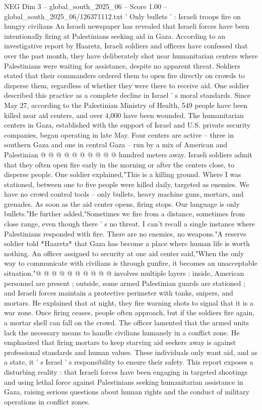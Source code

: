 \begin{textsample}{NEG Dim 3 – global\_south\_2025\_06 – Score 1.00 – global\_south\_2025\_06/126371112.txt}  \label{ex:f3_neg_259}
' Only bullets ' : Israeli troops fire on hungry civilians An Israeli newspaper has revealed that Israeli forces have been intentionally firing at Palestinians seeking aid in Gaza.
According to an investigative report by Haaretz, Israeli soldiers and officers have confessed that over the past month, they have deliberately shot near humanitarian centers where Palestinians were waiting for assistance, despite no apparent threat.
Soldiers stated that their commanders ordered them to open fire directly on crowds to disperse them, regardless of whether they were there to receive aid.
One soldier described this practice as a complete decline in Israel ' s moral standards.
Since May 27, according to the Palestinian Ministry of Health, 549 people have been killed near aid centers, and over 4,000 have been wounded.
The humanitarian centers in Gaza, established with the support of Israel and U.S. private security companies, began operating in late May.
Four centers are active -- three in southern Gaza and one in central Gaza -- run by a mix of American and Palestinian @ @ @ @ @ @ @ @ @ @ hundred meters away.
Israeli soldiers admit that they often open fire early in the morning or after the centers close, to disperse people.
One soldier explained,"This is a killing ground.
Where I was stationed, between one to five people were killed daily, targeted as enemies.
We have no crowd control tools -- only bullets, heavy machine guns, mortars, and grenades.
As soon as the aid center opens, firing stops.
Our language is only bullets."He further added,"Sometimes we fire from a distance, sometimes from close range, even though there ' s no threat.
I can't recall a single instance where Palestinians responded with fire.
There are no enemies, no weapons."A reserve soldier told *Haaretz* that Gaza has become a place where human life is worth nothing.
An officer assigned to security at one aid center said,"When the only way to communicate with civilians is through gunfire, it becomes an unacceptable situation."@ @ @ @ @ @ @ @ @ @ involves multiple layers : inside, American personnel are present ; outside, some armed Palestinian guards are stationed ; and Israeli forces maintain a protective perimeter with tanks, snipers, and mortars.
He explained that at night, they fire warning shots to signal that it is a war zone.
Once firing ceases, people often approach, but if the soldiers fire again, a mortar shell can fall on the crowd.
The officer lamented that the armed units lack the necessary means to handle civilians humanely in a conflict zone.
He emphasized that firing mortars to keep starving aid seekers away is against professional standards and human values.
These individuals only want aid, and as a state, it ' s Israel ' s responsibility to ensure their safety.
This report exposes a disturbing reality : that Israeli forces have been engaging in targeted shootings and using lethal force against Palestinians seeking humanitarian assistance in Gaza, raising serious questions about human rights and the conduct of military operations in conflict zones.

\end{textsample}
